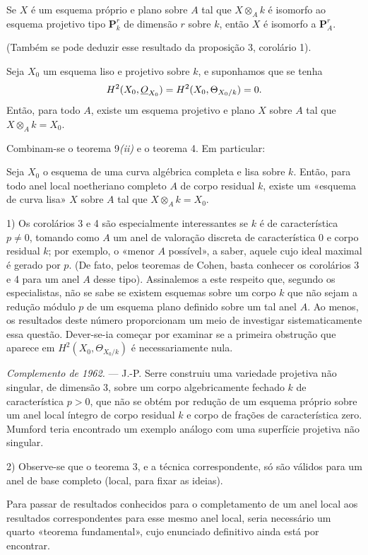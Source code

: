  Se $X$ é um esquema próprio e plano sobre $A$ tal que
$X\otimes_A k$ é isomorfo ao esquema projetivo tipo $\mathbf P_k^r$ de
dimensão $r$ sobre $k$, então $X$ é isomorfo a $\mathbf P_A^r$.

(Também se pode deduzir esse resultado da proposição 3, corolário 1).

 Seja $X_0$ um esquema liso e projetivo sobre $k$, e
suponhamos que se tenha
\[
  H^2(X_0,\underline{O}_{X_0})=H^2(X_0,\Theta_{X_0/k})=0.
\]
Então, para todo $A$, existe um esquema projetivo e plano $X$ sobre $A$ tal
que $X\otimes_A k=X_0$.

Combinam-se o teorema 9\textit{(ii)} e o teorema 4. Em particular:

 Seja $X_0$ o esquema de uma curva algébrica completa e
lisa sobre $k$. Então, para todo anel local noetheriano completo $A$ de
corpo residual $k$, existe um «esquema de curva lisa» $X$ sobre $A$ tal que
$X\otimes_A k=X_0$.


1) Os corolários 3 e 4 são especialmente interessantes se $k$ é de
característica $p\ne0$, tomando como $A$ um anel de valoração discreta de
característica $0$ e corpo residual $k$; por exemplo, o «menor $A$ possível»,
a saber, aquele cujo ideal maximal é gerado por $p$. (De fato, pelos
teoremas de Cohen, basta conhecer os corolários 3 e 4 para um anel $A$ desse
tipo). Assinalemos a este respeito que, segundo os especialistas, não se sabe se
existem esquemas sobre um corpo $k$ que não sejam a redução módulo $p$ de um
esquema plano definido sobre um tal anel $A$. Ao menos, os resultados deste
número proporcionam um meio de investigar sistematicamente essa questão. Dever-se-ia
começar por examinar se a primeira obstrução que aparece em
$H^2(X_0,\Theta_{X_0/k})$ é necessariamente nula.

\emph{Complemento de 1962.} --- J.-P. Serre construiu uma variedade
projetiva não singular, de dimensão 3, sobre um corpo algebricamente fechado
$k$ de característica $p>0$, que não se obtém por redução de um esquema
próprio sobre um anel local íntegro de corpo residual $k$ e corpo de
frações de característica zero. Mumford teria encontrado um exemplo análogo
com uma superfície projetiva não singular.

2) Observe-se que o teorema 3, e a técnica correspondente, só são válidos para
um anel de base completo (local, para fixar as ideias).

Para passar de resultados conhecidos para o completamento de um anel local aos
resultados correspondentes para esse mesmo anel local, seria necessário um
quarto «teorema fundamental», cujo enunciado definitivo ainda está por encontrar.


